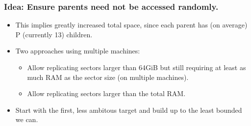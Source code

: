\documentclass[11pt]{article}
\begin{document}
\subsubsection{Idea: Ensure parents need not be accessed randomly.}
\label{sec-1-3-1}
\begin{itemize}
\item This implies greatly increased total space, since each parent has (on average) P (currently 13) children.
\item Two approaches using multiple machines:
\begin{itemize}
\item Allow replicating sectors larger than 64GiB but still requiring at least as much RAM as the sector size (on multiple machines).
\item Allow replicating sectors larger than the total RAM.
\end{itemize}
\item Start with the first, less ambitous target and build up to the least bounded we can.
\end{itemize}
\end{document}
